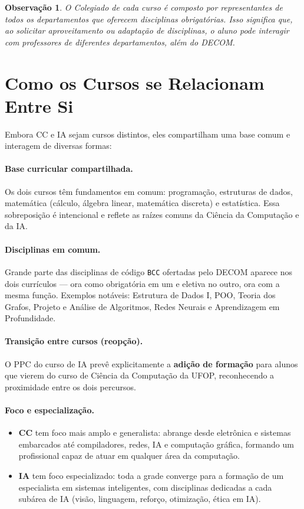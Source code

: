 \documentclass[9pt,a4paper]{extarticle}
\newcommand{\cc}[1]{\textcolor{cccolor}{\textbf{#1}}}
\newcommand{\ia}[1]{\textcolor{iacolor}{\textbf{#1}}}
\newtheorem{remark}{Observação}[section]
\begin{document}
\begin{remark}
O Colegiado de cada curso é composto por representantes de todos os departamentos que oferecem disciplinas obrigatórias. Isso significa que, ao solicitar aproveitamento ou adaptação de disciplinas, o aluno pode interagir com professores de diferentes departamentos, além do DECOM.
\end{remark}

\section{Como os Cursos se Relacionam Entre Si}

Embora CC e IA sejam cursos distintos, eles compartilham uma base comum e interagem de diversas formas:

\paragraph{Base curricular compartilhada.}
Os dois cursos têm fundamentos em comum: programação, estruturas de dados, matemática (cálculo, álgebra linear, matemática discreta) e estatística. Essa sobreposição é intencional e reflete as raízes comuns da Ciência da Computação e da IA.

\paragraph{Disciplinas em comum.}
Grande parte das disciplinas de código \texttt{BCC} ofertadas pelo DECOM aparece nos dois currículos --- ora como obrigatória em um e eletiva no outro, ora com a mesma função. Exemplos notáveis: Estrutura de Dados I, POO, Teoria dos Grafos, Projeto e Análise de Algoritmos, Redes Neurais e Aprendizagem em Profundidade.

\paragraph{Transição entre cursos (reopção).}
O PPC do curso de IA prevê explicitamente a \textbf{adição de formação} para alunos que vierem do curso de Ciência da Computação da UFOP, reconhecendo a proximidade entre os dois percursos.

\paragraph{Foco e especialização.}
\begin{itemize}
  \item \cc{CC} tem foco mais amplo e generalista: abrange desde eletrônica e sistemas embarcados até compiladores, redes, IA e computação gráfica, formando um profissional capaz de atuar em qualquer área da computação.
  \item \ia{IA} tem foco especializado: toda a grade converge para a formação de um especialista em sistemas inteligentes, com disciplinas dedicadas a cada subárea de IA (visão, linguagem, reforço, otimização, ética em IA).
\end{itemize}
\end{document}
